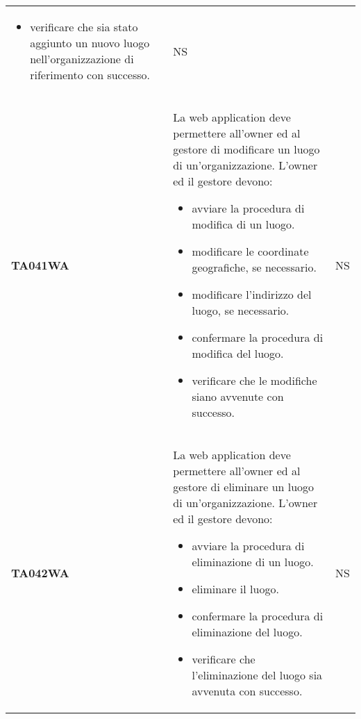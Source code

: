 \documentclass[../../piano-di-qualifica.tex]{subfiles}
\begin{document}
\begin{longtable}[H]{>{\centering\bfseries}m{3cm} >{}m{10cm} >{\centering\arraybackslash}m{3cm}}
\begin{itemize}
    \item verificare che sia stato aggiunto un nuovo luogo nell'organizzazione di riferimento con successo.
  \end{itemize}
                    & NS                                                                                                                                                                                                                                                               \\
  TA041WA           & La web application deve permettere all'owner ed al gestore di modificare un luogo di un'organizzazione. \newline
  L'owner ed il gestore devono:
  \begin{itemize}
    \item avviare la procedura di modifica di un luogo.
    \item modificare le coordinate geografiche, se necessario.
    \item modificare l'indirizzo del luogo, se necessario.
    \item confermare la procedura di modifica del luogo.
    \item verificare che le modifiche siano avvenute con successo.
  \end{itemize}
                    & NS                                                                                                                                                                                                                                                               \\
  TA042WA           & La web application deve permettere all'owner ed al gestore di eliminare un luogo di un'organizzazione. \newline
  L'owner ed il gestore devono:
  \begin{itemize}
    \item avviare la procedura di eliminazione di un luogo.
    \item eliminare il luogo.
    \item confermare la procedura di eliminazione del luogo.
    \item verificare che l'eliminazione del luogo sia avvenuta con successo.
  \end{itemize}
                    & NS                                                                                                                                                                                                                                                               \\

\end{longtable}
\end{document}
